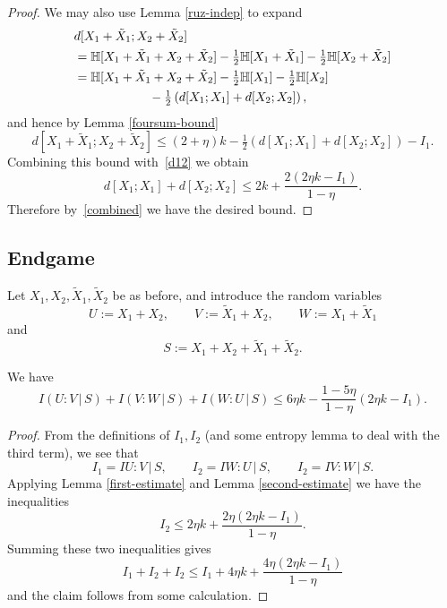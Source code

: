 \begin{proof}
  We may also use Lemma \ref{ruz-indep} to expand
  \begin{align*}
   & d[X_1+\tilde X_1;X_2+\tilde X_2] \\ &= \mathbb{H}[ X_1+\tilde X_1 + X_2 + \tilde X_2 ]  - \tfrac{1}{2} \mathbb{H}[X_1+\tilde X_1] - \tfrac{1}{2} \mathbb{H}[X_2+\tilde X_2] \\
    &= \mathbb{H}[ X_1+\tilde X_1 + X_2 + \tilde X_2]  - \tfrac{1}{2} \mathbb{H}[X_1] - \tfrac{1}{2} \mathbb{H}[X_2]  \\ & \qquad\qquad\qquad   - \tfrac{1}{2} \left( d[X_1;X_1] + d[X_2; X_2] \right),
  \end{align*}
  and hence by Lemma \ref{foursum-bound}
  \[
    d[X_1+\tilde X_1; X_2+\tilde X_2] \leq (2+\eta) k - \tfrac{1}{2} \left( d[X_1;X_1] + d[X_2;X_2] \right) - I_1.
  \]
  Combining this bound with~\eqref{d12} we obtain
  \[ d[X_1;X_1] + d[X_2;X_2] \leq 2 k + \frac{2(2 \eta k - I_1)}{1-\eta}. \]
  Therefore by~\eqref{combined} we have the desired bound.
\end{proof}


\subsection{Endgame}

Let $X_1,X_2,\tilde X_1,\tilde X_2$ be as before, and introduce the random variables
\[ U := X_1 + X_2, \qquad V := \tilde X_1 + X_2, \qquad W := X_1 + \tilde X_1\] and
\[   S := X_1 + X_2 + \tilde X_1 + \tilde X_2.\]

\begin{lemma}\label{uvw-s}
\leanok
We have
$$
I(U : V \, | \, S) + I(V : W \, | \,S) + I(W : U \, | \, S) \leq 6 \eta k - \frac{1 - 5 \eta}{1-\eta} (2 \eta k - I_1).
$$
\end{lemma}

\begin{proof}
From the definitions of $I_1,I_2$ (and some entropy lemma to deal with the third term), we see that
\[
  I_1 = I{U : V \, | \, S}, \qquad I_2 = I{W : U \, | \, S}, \qquad I_2 = I{V : W \, | \,S}.
\]
Applying Lemma \ref{first-estimate} and Lemma \ref{second-estimate} we have the inequalities
\[   I_2 \leq 2 \eta k + \frac{2\eta(2 \eta k - I_1)}{1-\eta} .
\]
Summing these two inequalities gives
$$
   I_1 + I_2 + I_2 \leq I_1+4\eta k+ \frac{4\eta(2 \eta k - I_1)}{1-\eta}
$$
and the claim follows from some calculation.
\end{proof}

